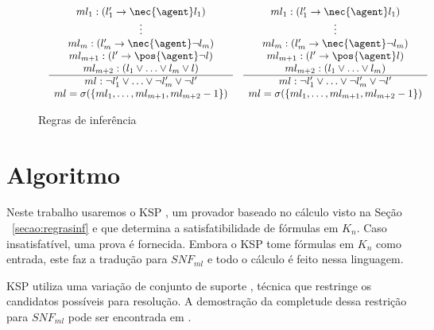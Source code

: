 \begin{figure*}[t]
\[\begin{array}{c}
\begin{array}{ll}
	\begin{array}{c}
	ml_1: (l_1' \rightarrow \nec{\agent} l_1) \\
	\vdots \\
	ml_m: (l_m' \rightarrow \nec{\agent} \neg l_m) \\
	ml_{m+1}: (l' \rightarrow \pos{\agent} \neg l) \\
	ml_{m+2}: (l_1 \lor \ldots \lor l_m \lor l) \\
	\hline
	ml: \neg l_1' \lor \ldots \lor \neg l_m' \lor \neg l' \\
	ml = \sigma(\{ml_1, \ldots, ml_{m+1}, ml_{m+2}-1\}) \\
	\end{array}
	&
	\begin{array}{c}
	ml_1: (l_1' \rightarrow \nec{\agent} l_1) \\
	\vdots \\
	ml_m: (l_m' \rightarrow \nec{\agent} \neg l_m) \\
	ml_{m+1}: (l' \rightarrow \pos{\agent} l) \\
	ml_{m+2}: (l_1 \lor \ldots \lor l_m) \\
	\hline
	ml: \neg l_1' \lor \ldots \lor \neg l_m' \lor \neg l' \\
	ml = \sigma(\{ml_1, \ldots, ml_{m+1}, ml_{m+2}-1\}) \\
	\end{array}
	
	\\ \end{array} \\
	\end{array} 
	\]
	\caption{Regras de inferência}
	\label{figura:regrasinf}
\end{figure*}



\section{Algoritmo}
Neste trabalho usaremos o KSP \cite{Nalon2020}, um provador baseado no cálculo visto na Seção ~\ref{secao:regrasinf} e que determina a satisfatibilidade de fórmulas em $K_n$. Caso insatisfatível, uma prova é fornecida. Embora o KSP tome fórmulas em $K_n$ como entrada, este faz a tradução para $SNF_{ml}$ e todo o cálculo é feito nessa linguagem.

KSP utiliza uma variação de conjunto de suporte%
, técnica que restringe os candidatos possíveis para resolução. A demostração da completude dessa restrição para $SNF_{ml}$ pode ser encontrada em \cite{nalontocl}.

